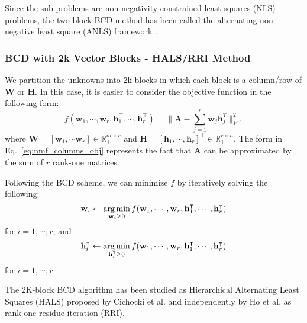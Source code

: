 Since the sub-problems are non-negativity constrained least squares (NLS) problems, the
two-block BCD method has been called the alternating non-negative least
square (ANLS) framework \cite{Lin2007,Kim2008,Kim2011}.

\subsubsection{BCD with 2k Vector Blocks - HALS/RRI Method}
We partition the unknowns into 2k blocks in which each block
is a column/row of $\mathbf{W}$ or $\mathbf{H}$. In this case,
it is easier to consider the objective function in the following
form:
\begin{equation}
f(\mathbf{w}_{1},\cdots,\mathbf{w}_{r},\mathbf{h}_{1}^\intercal,\cdots,\mathbf{h}_{r}^\intercal)=\|\mathbf{A}-\sum_{j=1}^{r}\mathbf{w}_{j}\mathbf{h}_{j}^{T}\|_{F}^{2},\label{eq:nmf_columns_obj}
\end{equation}
where
$\mathbf{W}=[\mathbf{w}_{1},\cdots\mathbf{w}_{r}]\in\mathbb{R}_{+}^{m\times
r}$ and
$\mathbf{H}=[\mathbf{h}_{1},\cdots,\mathbf{h}_{r}]^\intercal\in\mathbb{R}_{+}^{r\times
n}$. The form in Eq.~\eqref{eq:nmf_columns_obj} represents the fact
that  $\mathbf{A}$ can be  approximated by the sum of $r$ rank-one
matrices.

Following the BCD scheme, we can minimize $f$ by iteratively solving
the following:
\[
\mathbf{w}_{i}\leftarrow\mathop{\rm arg\,min}_{\mathbf{w}_{i}\ge0}f(\mathbf{w}_{1},\cdots,\mathbf{w}_{r},\mathbf{h}_{1}^\intercal,\cdots,\mathbf{h}_{r}^\intercal)
\]
 for $i=1,\cdots,r$, and
\[
\mathbf{h}_{i}^\intercal\leftarrow\mathop{\rm arg\,min}_{\mathbf{h}_{i}^\intercal\ge0}f(\mathbf{w}_{1},\cdots,\mathbf{w}_{r},\mathbf{h}_{1}^\intercal,\cdots,\mathbf{h}_{r}^\intercal)
\]
 for $i=1,\cdots,r$.


The  2K-block BCD algorithm has been studied as Hierarchical
Alternating Least Squares (HALS) proposed by Cichocki et al.
\cite{Cichocki2007,Cichocki2009} and independently by Ho et al.
\cite{Ho2008} as rank-one residue iteration (RRI).

